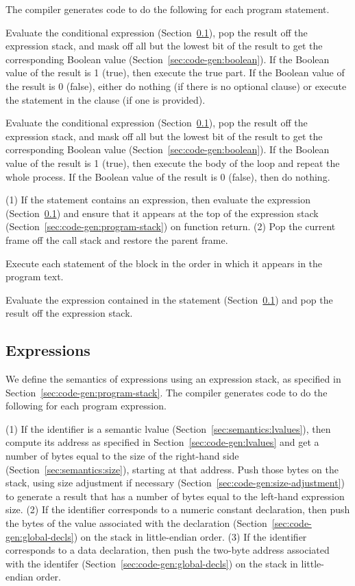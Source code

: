 \documentclass[10pt]{article}
\begin{document}
The compiler generates code to do the following for each program
statement.

 Evaluate the conditional expression
(Section~\ref{sec:code-gen:expressions}), pop the result off the
expression stack, and mask off all but the lowest bit of the result to
get the corresponding Boolean value
(Section~\ref{sec:code-gen:boolean}).  If the Boolean value of the
result is 1 (true), then execute the true part.  If the Boolean value
of the result is 0 (false), either do nothing (if there is no optional
 clause) or execute the statement in the  clause
(if one is provided).

 Evaluate the conditional expression
(Section~\ref{sec:code-gen:expressions}), pop the result off the
expression stack, and mask off all but the lowest bit of the result to
get the corresponding Boolean value
(Section~\ref{sec:code-gen:boolean}).  If the Boolean value of the
result is 1 (true), then execute the body of the loop and repeat the
whole process.  If the Boolean value of the result is 0 (false), then
do nothing.

 (1) If the statement contains an
expression, then evaluate the expression
(Section~\ref{sec:code-gen:expressions}) and ensure that it appears at
the top of the expression stack
(Section~\ref{sec:code-gen:program-stack}) on function return.  (2)
Pop the current frame off the call stack and restore the parent frame.

 Execute each statement of the block in the
order in which it appears in the program text.

 Evaluate the expression contained in
the statement (Section~\ref{sec:code-gen:expressions}) and pop the
result off the expression stack.

\subsection{Expressions}
\label{sec:code-gen:expressions}

We define the semantics of expressions using an expression stack, as
specified in Section~\ref{sec:code-gen:program-stack}.  The compiler
generates code to do the following for each program expression.

 (1) If the identifier is a semantic lvalue
(Section~\ref{sec:semantics:lvalues}), then compute its address as
specified in Section~\ref{sec:code-gen:lvalues} and get a number of
bytes equal to the size of the right-hand side
(Section~\ref{sec:semantics:size}), starting at that address.  Push
those bytes on the stack, using size adjustment if necessary
(Section~\ref{sec:code-gen:size-adjustment}) to generate a result that
has a number of bytes equal to the left-hand expression size. (2) If
the identifier corresponds to a numeric constant declaration, then
push the bytes of the value associated with the declaration
(Section~\ref{sec:code-gen:global-decls}) on the stack in
little-endian order.  (3) If the identifier corresponds to a data
declaration, then push the two-byte address associated with the
identifer (Section~\ref{sec:code-gen:global-decls}) on the stack in
little-endian order.
\end{document}
